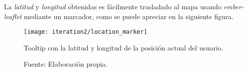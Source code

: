 La \emph{latitud} y \emph{longitud} obtenidas es fácilmente trasladado al mapa usando \emph{ember-leaflet} mediante un marcador, como se puede apreciar en la siguiente figura.

\begin{figure}[H]
  \begin{center}
    \texttt{[image: iteration2/location\_marker]}
    \caption{Tooltip con la latitud y longitud de la posición actual del usuario.}
    \label{fig:location_marker}
    \caption*{Fuente: Elaboración propia.}
  \end{center}
\end{figure}


%
%
%
%



